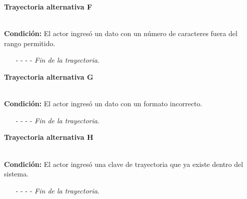 \hypertarget{CU12-1-1-1:TAF}{\textbf{Trayectoria alternativa F}}\\
\noindent \textbf{Condición:} El actor ingresó un dato con un número de caracteres fuera del rango permitido.
\begin{enumerate}
	\UCpaso[\UCsist] Muestra el mensaje  señalando el campo que presenta el error en la pantalla .
	\UCpaso Regresa al paso \ref{CU12.1.1.1-P16} de la trayectoria principal.
	\item[- -] - - {\em {Fin de la trayectoria}}.%
\end{enumerate}
\hypertarget{CU12-1-1-1:TAG}{\textbf{Trayectoria alternativa G}}\\
\noindent \textbf{Condición:} El actor ingresó un dato con un formato incorrecto.
\begin{enumerate}
	\UCpaso[\UCsist] Muestra el mensaje  señalando el campo que presenta el error en la pantalla .
	\UCpaso Regresa al paso \ref{CU12.1.1.1-P16} de la trayectoria principal.
	\item[- -] - - {\em {Fin de la trayectoria}}.
\end{enumerate}
\hypertarget{CU2-1-1-1:TAH}{\textbf{Trayectoria alternativa H}}\\
\noindent \textbf{Condición:} El actor ingresó una clave de trayectoria que ya existe dentro del sistema.
\begin{enumerate}
	\UCpaso[\UCsist] Muestra el mensaje  señalando el campo que presenta la duplicidad en la pantalla .
	\UCpaso Regresa al paso \ref{CU12.1.1.1-P16} de la trayectoria principal.
	\item[- -] - - {\em {Fin de la trayectoria}}.
\end{enumerate}